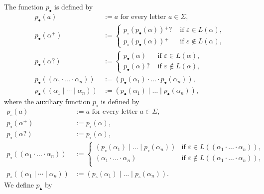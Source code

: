 \documentclass[a4paper,11pt, svgnames,titlepage]{article}
\newcommand{\rxp}{{^\mathtt{+}}}
\newcommand{\rxo}{\mathtt{?}}
\newcommand{\rxc}{\cdot}
\DeclareMathOperator{\ror}{\mathtt{|}}
\newcommand{\emptyword}{\varepsilon}
\newcommand{\df}{:=}
\newcommand{\wpnffun}{p_{\bullet}}
\newcommand{\wpnfhfun}{p_{\circ}}
\newcommand{\pnfupfun}{p_{\blacktriangle}}
\newcommand{\wpnf}[1]{\wpnffun{\left(#1\right)}}
\newcommand{\wpnfh}[1]{\wpnfhfun{\left(#1\right)}}
\begin{document}
The function $\wpnffun$ is defined by
\begin{align*}
	\wpnf{a}&\df a \text{ for every letter $a\in \Sigma$,}\\
	\wpnf{\alpha\rxp}
		&\df \begin{cases}
			\wpnfh{\wpnf{\alpha}}\rxp\rxo & \text{ if $\emptyword\in L(\alpha)$,}\\
			\wpnfh{\wpnf{\alpha}}\rxp & \text{ if $\emptyword\notin L(\alpha)$,}
		\end{cases}\\
	\wpnf{\alpha\rxo}
		&\df \begin{cases}
			\wpnf{\alpha} & \text{ if $\emptyword\in L(\alpha)$,}\\
			\wpnf{\alpha}\rxo & \text{ if $\emptyword\notin L(\alpha)$,}
		\end{cases}\\
	\wpnf{(\alpha_1\rxc \ldots \rxc \alpha_n)}
		&\df (\wpnf{\alpha_1}\rxc \ldots \rxc \wpnf{\alpha_n}),\\
	\wpnf{(\alpha_1\ror \cdots \ror \alpha_n)}
		&\df (\wpnf{\alpha_1} \ror \ldots \ror \wpnf{\alpha_n}),
\end{align*}
where the auxiliary function $\wpnfhfun$ is defined by 
\begin{align*}
	\wpnfh{a}&\df a\text{ for every letter $a\in \Sigma$,}\\
	\wpnfh{\alpha\rxp}
		&\df \wpnfh{\alpha},\\
	\wpnfh{\alpha\rxo}
		&\df \wpnfh{\alpha},\\
	\wpnfh{(\alpha_1\rxc \ldots \rxc \alpha_n)}
		&\df \begin{cases}
			(\wpnfh{\alpha_1}\ror \ldots \ror \wpnfh{\alpha_n}) & \text{if $\emptyword\in L((\alpha_1\rxc \ldots \rxc \alpha_n))$},\\
			(\alpha_1\rxc \ldots \rxc \alpha_n) & \text{if $\emptyword\notin L((\alpha_1\rxc \ldots \rxc \alpha_n))$},\\
		\end{cases}\\
	\wpnfh{(\alpha_1\ror \cdots \ror \alpha_n)}
		&\df (\wpnfh{\alpha_1}\ror \ldots \ror \wpnfh{\alpha_n}).
\end{align*}
We define $\pnfupfun$ by
\end{document}
